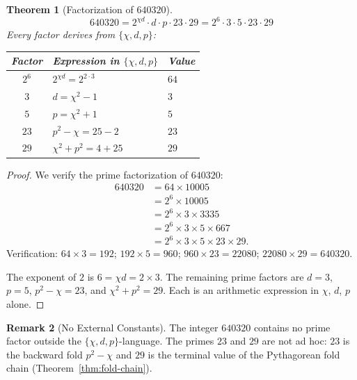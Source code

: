 \documentclass[11pt,a4paper]{article}
\theoremstyle{plain}
\newtheorem{theorem}{Theorem}[section]
\theoremstyle{definition}
\newtheorem{remark}[theorem]{Remark}
\begin{document}
\begin{theorem}[Factorization of $640320$]\label{thm:640320}
\begin{equation}\label{eq:640320}
  \boxed{\;
  640320 = 2^{\chi d} \cdot d \cdot p \cdot 23 \cdot 29
  = 2^6 \cdot 3 \cdot 5 \cdot 23 \cdot 29
  \;}
\end{equation}
Every factor derives from $\{\chi, d, p\}$:
\begin{center}
\begin{tabular}{@{}cll@{}}
\toprule
Factor & Expression in $\{\chi, d, p\}$ & Value \\
\midrule
$2^6$ & $2^{\chi d} = 2^{2 \cdot 3}$ & $64$ \\
$3$ & $d = \chi^2 - 1$ & $3$ \\
$5$ & $p = \chi^2 + 1$ & $5$ \\
$23$ & $p^2 - \chi = 25 - 2$ & $23$ \\
$29$ & $\chi^2 + p^2 = 4 + 25$ & $29$ \\
\bottomrule
\end{tabular}
\end{center}
\end{theorem}

\begin{proof}
We verify the prime factorization of $640320$:
\begin{align*}
  640320 &= 64 \times 10005 \\
         &= 2^6 \times 10005 \\
         &= 2^6 \times 3 \times 3335 \\
         &= 2^6 \times 3 \times 5 \times 667 \\
         &= 2^6 \times 3 \times 5 \times 23 \times 29.
\end{align*}
Verification: $64 \times 3 = 192$; $192 \times 5 = 960$;
$960 \times 23 = 22080$; $22080 \times 29 = 640320$. \checkmark

The exponent of $2$ is $6 = \chi d = 2 \times 3$.
The remaining prime factors are $d = 3$, $p = 5$,
$p^2 - \chi = 23$, and $\chi^2 + p^2 = 29$.
Each is an arithmetic expression in $\chi$, $d$, $p$ alone.
\end{proof}

\begin{remark}[No External Constants]\label{rem:no-external}
The integer $640320$ contains no prime factor outside the
$\{\chi, d, p\}$-language. The primes $23$ and $29$ are not ad hoc:
$23$ is the backward fold $p^2 - \chi$ and $29$ is the terminal
value of the Pythagorean fold chain (Theorem~\ref{thm:fold-chain}).
\end{remark}
\end{document}
